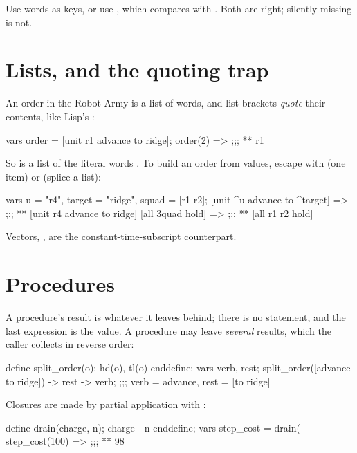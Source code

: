 Use words as keys, or use , which compares with \code{=}.
Both are right; silently missing is not.

\section{Lists, and the quoting trap}

An order in the Robot Army is a list of words, and list brackets
\emph{quote} their contents, like Lisp's :

\begin{pop}
vars order = [unit r1 advance to ridge];
order(2) =>               ;;; ** r1
\end{pop}

So  is a list of the literal words
. To build an order from values, escape with
\code{\textasciicircum} (one item) or \code{\textasciicircum\textasciicircum}
(splice a list):

\begin{pop}
vars u = "r4", target = "ridge", squad = [r1 r2];
[unit ^u advance to ^target] =>     ;;; ** [unit r4 advance to ridge]
[all ^^squad hold] =>               ;;; ** [all r1 r2 hold]
\end{pop}

Vectors, , are the constant-time-subscript counterpart.

\section{Procedures}

A procedure's result is whatever it leaves behind; there is no 
statement, and the last expression is the value. A procedure may leave
\emph{several} results, which the caller collects in reverse order:

\begin{pop}
define split_order(o); hd(o), tl(o) enddefine;
vars verb, rest;
split_order([advance to ridge]) -> rest -> verb;   ;;; verb = advance, rest = [to ridge]
\end{pop}

Closures are made by partial application with \code{\%\ldots\%}:

\begin{pop}
define drain(charge, n); charge - n enddefine;
vars step_cost = drain(%
step_cost(100) =>                   ;;; ** 98
\end{pop}


